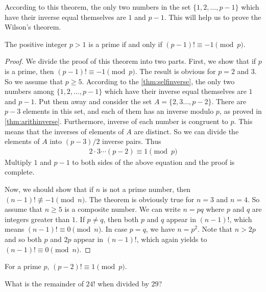 According to this theorem, the only two numbers in the set $\{1, 2, \ldots, p-1\}$ which have their inverse equal themselves are $1$ and $p-1$. This will help us to prove the Wilson's theorem.
	\begin{theorem}
		The positive integer $p>1$ is a prime if and only if $(p-1)! \equiv -1 \pmod p$.
	\end{theorem}

	\begin{proof}
		We divide the proof of this theorem into two parts. First, we show that if $p$ is a prime, then $(p-1)! \equiv -1 \pmod p$.
		The result is obvious for $p=2$ and $3$. So we assume that $p \geq 5$. According to the \autoref{thm:selfinverse}, the only two numbers among  $\{1, 2, \ldots, p-1\}$ which have their inverse equal themselves are $1$ and $p-1$. Put them away and consider the set  $A=\{2, 3 \ldots, p-2\}$. There are $p-3$ elements in this set, and each of them has an inverse modulo $p$, as proved in \autoref{thm:arithinverse}. Furthermore, inverse of each number is congruent to $p$. This means that the inverses of elements of $A$ are distinct. So we can divide the elements of $A$ into $(p-3)/2$ inverse pairs. Thus
		\begin{align*}
		2 \cdot 3  \cdots  (p-2) \equiv 1 \pmod p
		\end{align*}
		Multiply $1$ and $p-1$ to both sides of the above equation and the proof is complete.

		Now, we should show that if $n$ is not a prime number, then $(n-1)! \not \equiv -1 \pmod n$.
		The theorem is obviously true for $n=3$ and $n=4$. So assume that $n \geq 5$ is a composite number. We can write $n=pq$ where $p$ and $q$ are integers greater than $1$. If $p \neq q$, then both $p$ and $q$ appear in $(n-1)!$, which means $(n-1)! \equiv 0 \pmod n$. In case $p=q$, we have $n=p^2$. Note that $n>2p$ and so both $p$ and $2p$ appear in $(n-1)!$, which again yields to $(n-1)! \equiv 0 \pmod n$.
	\end{proof}

	\begin{corollary}
		For a prime $p$, $(p-2)! \equiv 1 \pmod p$.
	\end{corollary}

	\begin{problem}
		What is the remainder of $24!$ when divided by $29$?
	\end{problem}

